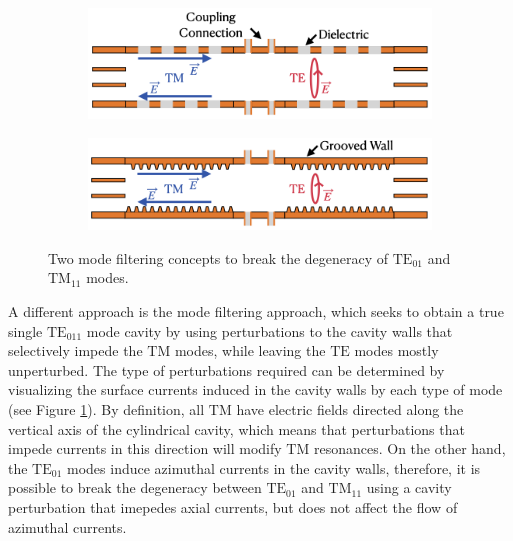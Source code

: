 \begin{figure}[htbp]
    \centering
    \begin{subfigure}{0.7\textwidth}
        \centering
        \includegraphics*[width=\textwidth]{figs/Chapter-6/230608_insulator_mode_filter_cartoon.png}
        \caption{}
    \end{subfigure}
    \hfill
    \begin{subfigure}{0.7\textwidth}
        \centering
        \includegraphics*[width=\textwidth]{figs/Chapter-6/230608_grooved_mode_filter_cartoon.png}
        \caption{}
    \end{subfigure}
    \caption{\label{fig:chap6-mode-filter-cartoons} Two mode filtering concepts to break the degeneracy of $\mathrm{TE}_{01}$ and $\mathrm{TM}_{11}$ modes. }
\end{figure}

A different approach is the mode filtering approach, which seeks to obtain a true single $\mathrm{TE}_{011}$ mode cavity by using perturbations to the cavity walls that selectively impede the $\mathrm{TM}$ modes, while leaving the $\mathrm{TE}$ modes mostly unperturbed.
The type of perturbations required can be determined by visualizing the surface currents induced in the cavity walls by each type of mode (see Figure \ref{fig:chap6-mode-filter-cartoons}). By definition, all $\mathrm{TM}$ have electric fields directed along the vertical axis of the cylindrical cavity, which means that perturbations that impede currents in this direction will modify $\mathrm{TM}$ resonances. On the other hand, the $\mathrm{TE}_{01}$ modes induce azimuthal currents in the cavity walls, therefore, it is possible to break the degeneracy between $\mathrm{TE}_{01}$ and $\mathrm{TM}_{11}$ using a cavity perturbation that imepedes axial currents, but does not affect the flow of azimuthal currents. 

